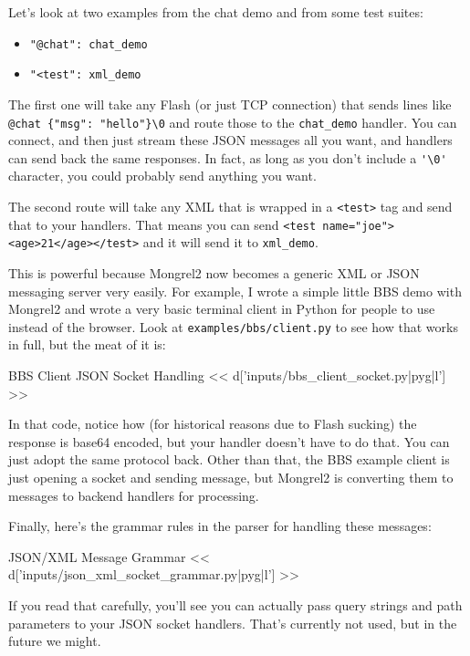Let's look at two examples from the chat demo and from some test suites:

\begin{itemize}
\item \verb|"@chat": chat_demo|
\item \verb|"<test": xml_demo|
\end{itemize}

The first one will take any Flash (or just TCP connection) that sends lines like
\verb|@chat {"msg": "hello"}\0| and route those to the \verb|chat_demo| handler.
You can connect, and then just stream these JSON messages all you want, and handlers
can send back the same responses.  In fact, as long as you don't include a \verb|'\0'|
character, you could probably send anything you want.

The second route will take any XML that is wrapped in a \verb|<test>| tag and send
that to your handlers.  That means you can send \verb|<test name="joe"><age>21</age></test>|
and it will send it to \verb|xml_demo|.

This is powerful because Mongrel2 now becomes a generic XML or JSON messaging
server very easily.  For example, I wrote a simple little BBS demo with Mongrel2
and wrote a very basic terminal client in Python for people to use instead
of the browser.  Look at \verb|examples/bbs/client.py| to see how that works in
full, but the meat of it is:

\begin{code}{BBS Client JSON Socket Handling}
<< d['inputs/bbs_client_socket.py|pyg|l'] >>
\end{code}

In that code, notice how (for historical reasons due to Flash sucking) the
response is base64 encoded, but your handler doesn't have to do that.  You can
just adopt the same protocol back.  Other than that, the BBS example client
is just opening a socket and sending message, but Mongrel2 is converting them
to messages to backend handlers for processing.

Finally, here's the grammar rules in the parser for handling these messages:

\begin{code}{JSON/XML Message Grammar}
<< d['inputs/json_xml_socket_grammar.py|pyg|l'] >>
\end{code}

If you read that carefully, you'll see you can actually pass query strings
and path parameters to your JSON socket handlers.  That's currently not
used, but in the future we might.

